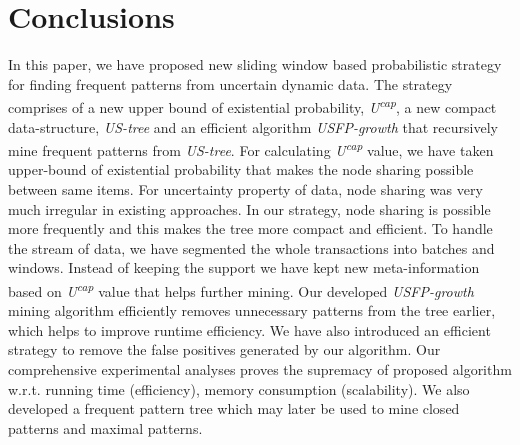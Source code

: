 \documentclass[conference]{IEEEtran}
\begin{document}
\section{Conclusions}\label{Conclusion}
In this paper, we have proposed new sliding window based probabilistic strategy for finding frequent patterns from uncertain dynamic data. The strategy comprises of a new upper bound of existential probability, \emph{U\textsuperscript{cap}}, a new compact data-structure, \emph{US-tree} and an efficient algorithm \emph{USFP-growth} that recursively mine frequent patterns from \emph{US-tree}. For calculating \emph{U\textsuperscript{cap}} value, we have taken upper-bound of existential probability that makes the node sharing possible between same items. For uncertainty property of data, node sharing was very much irregular in existing approaches. In our strategy, node sharing is possible more frequently and this makes the tree more compact and efficient. To handle the stream of data, we have segmented the whole transactions into batches and windows. Instead of keeping the support we have kept new meta-information based on \emph{U\textsuperscript{cap}} value that helps further mining. Our developed \emph{USFP-growth} mining algorithm efficiently removes unnecessary patterns from the tree earlier, which helps to improve runtime efficiency. We have also introduced an efficient strategy to remove the false positives generated by our algorithm. Our comprehensive experimental analyses proves the supremacy of proposed algorithm w.r.t. running time (efficiency), memory consumption (scalability). We also developed a frequent pattern tree which may later be used to mine closed patterns and maximal patterns.


%


\end{document}
